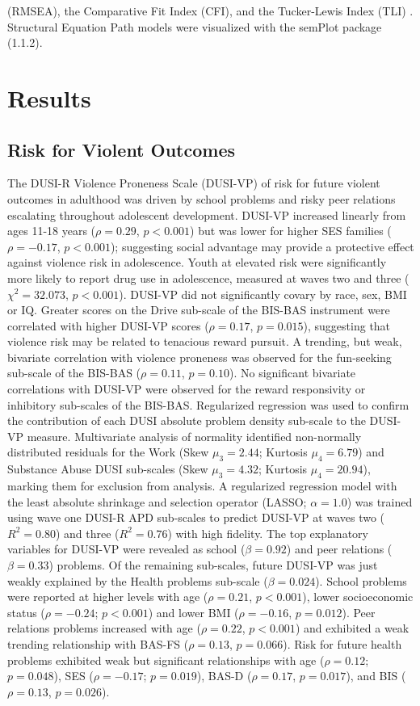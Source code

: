 \documentclass[utf8]{article}
\begin{document}
(RMSEA), the Comparative Fit Index (CFI), and the Tucker-Lewis Index (TLI) \citep{KennyEtAl2015,HuTzeBentler1999, wu2009evaluating}. Structural Equation Path models were visualized with the semPlot package (1.1.2). 

\section{Results} 
\subsection{Risk for Violent Outcomes} The DUSI-R Violence Proneness Scale (DUSI-VP) of risk for future violent outcomes in adulthood was driven by school problems and risky peer relations escalating throughout adolescent development. DUSI-VP increased linearly from ages 11-18 years ($\rho=0.29$,  $p<0.001$) but was lower for higher SES families ($\rho=-0.17$, $p<0.001$); suggesting social advantage may provide a protective effect against violence risk in adolescence. Youth at elevated risk were significantly more likely to report drug use in adolescence, measured at waves two and three ($\chi^2 = 32.073$, $p<0.001$). DUSI-VP did not significantly covary by race, sex, BMI or IQ. Greater scores on the Drive sub-scale of the BIS-BAS instrument were correlated with higher DUSI-VP scores ($\rho=0.17$, $p=0.015$), suggesting that violence risk may be related to tenacious reward pursuit. A trending, but weak, bivariate correlation with violence proneness was observed for the fun-seeking sub-scale of the BIS-BAS ($\rho=0.11$, $p=0.10$). No significant bivariate correlations with DUSI-VP were observed for the reward responsivity or inhibitory sub-scales of the BIS-BAS. Regularized regression was used to confirm the contribution of each DUSI absolute problem density sub-scale to the DUSI-VP measure. Multivariate analysis of normality identified non-normally distributed residuals for the Work (Skew $\mu_3=2.44$; Kurtosis $\mu_4=6.79$) and Substance Abuse DUSI sub-scales (Skew $\mu_3=4.32$; Kurtosis $\mu_4=20.94$), marking them for exclusion from analysis. A regularized regression model with the least absolute shrinkage and selection operator (LASSO; $\alpha=1.0$) was trained using wave one DUSI-R APD sub-scales to predict DUSI-VP at waves two ($R^2=0.80$) and three ($R^2=0.76$) with high fidelity. The top explanatory variables for DUSI-VP were revealed as school ($\beta=0.92$) and peer relations ($\beta=0.33$) problems. Of the remaining sub-scales, future DUSI-VP was just weakly explained by the Health problems sub-scale ($\beta=0.024$). School problems were reported at higher levels with age ($\rho=0.21$, $p<0.001$), lower socioeconomic status ($\rho=-0.24$; $p<0.001$) and lower BMI ($\rho=-0.16$, $p=0.012$). Peer relations problems increased with age ($\rho=0.22$, $p<0.001$) and exhibited a weak trending relationship with BAS-FS ($\rho=0.13$, $p=0.066$). Risk for future health problems exhibited weak but significant relationships with age ($\rho=0.12$; $p=0.048$), SES ($\rho=-0.17$; $p=0.019$), BAS-D ($\rho=0.17$, $p=0.017$), and BIS ($\rho=0.13$, $p=0.026$). 
%
\vspace{20pt}
\end{document}
